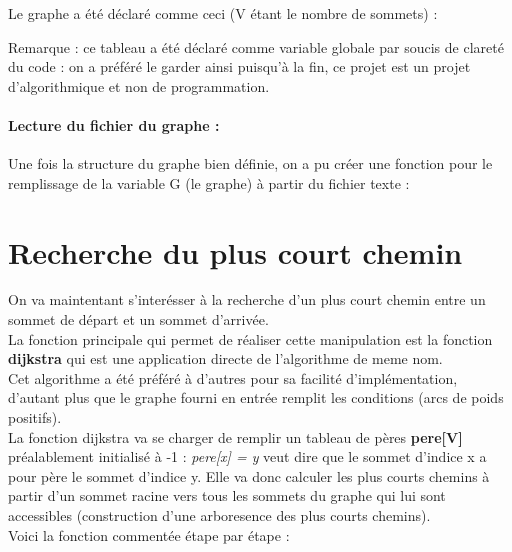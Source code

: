 \documentclass[a4]{article}
\begin{document}
			Le graphe a été déclaré comme ceci (V étant le nombre de sommets) :
			
			Remarque : ce tableau a été déclaré comme variable globale par soucis de clareté du code : on a préféré le garder ainsi 
			puisqu'à la fin, ce projet est un projet d'algorithmique et non de programmation.
			
			\paragraph{Lecture du fichier du graphe :\\}
			Une fois la structure du graphe bien définie, on a pu créer une fonction pour le remplissage de la variable G (le graphe) à partir du
			fichier texte :
			
	
	\section{Recherche du plus court chemin}
			On va maintentant s'interésser à la recherche d'un plus court chemin entre un sommet de départ et un sommet d'arrivée.\\
			La fonction principale qui permet de réaliser cette manipulation est la fonction \textbf{dijkstra} qui est une application 
			directe de l'algorithme de meme nom.\\
			Cet algorithme a été préféré à d'autres pour sa facilité d'implémentation, d'autant plus que le graphe fourni en entrée remplit les 
			conditions (arcs de poids positifs).\\
			La fonction dijkstra va se charger de remplir un tableau de pères \textbf{pere[V]} préalablement initialisé à -1 : 
			\textit{pere[x] = y} veut dire que le sommet d'indice x a pour père le sommet d'indice y. Elle va donc calculer les plus courts chemins 
			à partir d'un sommet racine vers tous les sommets du graphe qui lui sont accessibles (construction d'une arboresence des plus courts 
			chemins).\\
			Voici la fonction commentée étape par étape :
			
			
\end{document}

